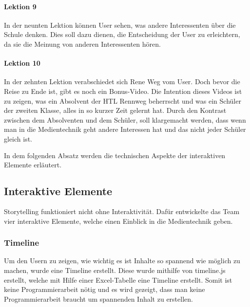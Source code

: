 \paragraph{Lektion 9}
In der neunten Lektion können User sehen, was andere Interessenten über die Schule denken. Dies soll dazu dienen, die Entscheidung der User zu erleichtern, da sie die Meinung von anderen Interessenten hören.

\paragraph{Lektion 10}
In der zehnten Lektion verabschiedet sich Rene Weg vom User. Doch bevor die Reise zu Ende ist, gibt es noch ein Bonus-Video. Die Intention dieses Videos ist zu zeigen, was ein Absolvent der HTL Rennweg beherrscht und was ein Schüler der zweiten Klasse, alles in so kurzer Zeit gelernt hat. Durch den Kontrast zwischen dem Absolventen und dem Schüler, soll klargemacht werden, dass wenn man in die Medientechnik geht andere Interessen hat und das nicht jeder Schüler gleich ist.

In dem folgenden Absatz werden die technischen Aspekte der interaktiven Elemente erläutert.


\subsection{Interaktive Elemente}

Storytelling funktioniert nicht ohne Interaktivität.  Dafür entwickelte das Team vier interaktive Elemente, welche einen Einblick in die Medientechnik geben. 
\subsubsection{Timeline}
Um den Usern zu zeigen, wie wichtig es ist Inhalte so spannend wie möglich zu machen, wurde eine Timeline erstellt. Diese wurde mithilfe von timeline.js erstellt, welche mit Hilfe einer Excel-Tabelle eine Timeline erstellt. Somit ist keine Programmierarbeit nötig und es wird gezeigt, dass man keine Programmierarbeit braucht um spannenden Inhalt zu erstellen.
